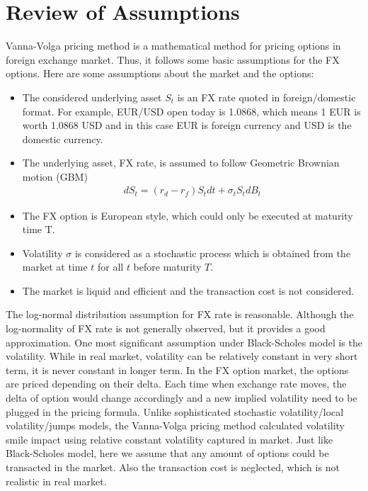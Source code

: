 \chapter{Review of Assumptions}

Vanna-Volga pricing method is a mathematical method for pricing options in foreign exchange market. Thus, it follows some basic assumptions for the FX options. Here are some assumptions about the market and the options:
\begin{itemize}
	\item The considered underlying asset $S_t$ is an FX rate quoted in foreign/domestic format. For example, EUR/USD open today is 1.0868, which means 1 EUR is worth 1.0868 USD and in this case EUR is foreign currency and USD is the domestic currency.
	\item The underlying asset, FX rate, is assumed to follow Geometric Brownian motion (GBM)
	\begin{align}
	dS_t = \left( r_d - r_f\right) S_tdt + \sigma_t S_t dB_t
	\end{align}  
	\item The FX option is European style, which could only be executed at maturity time T.
	\item Volatility $\sigma$ is considered as a stochastic process which is obtained from the market at time $t$ for all $t$ before maturity $T$. 
	\item The market is liquid and efficient and the transaction cost is not considered.
\end{itemize}
The log-normal distribution assumption for FX rate is reasonable. Although the log-normality of FX rate is not generally observed, but it provides a good approximation. 
\newline
\newline
One most significant assumption under Black-Scholes model is the volatility. While in real market, volatility can be relatively constant in very short term, it is never constant in longer term. In the FX option market, the options are priced depending on their delta. Each time when exchange rate moves, the delta of option would change accordingly and a new implied volatility need to be plugged in the pricing formula. Unlike sophisticated stochastic volatility/local volatility/jumps models, the Vanna-Volga pricing method calculated volatility smile impact using relative constant volatility captured in market. 
\newline
\newline
Just like Black-Scholes model, here we assume that any amount of options could be transacted in the market. Also the transaction cost is neglected, which is not realistic in real market.